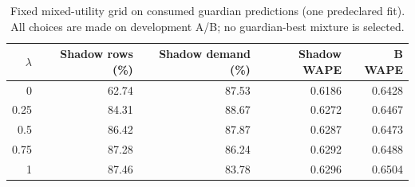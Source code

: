 \begin{table}[htbp]\centering\small
\caption{Fixed mixed-utility grid on consumed guardian predictions (one predeclared fit). All choices are made on development A/B; no guardian-best mixture is selected.}
\label{tab:mixed}
\begin{tabular}{rrrrr}\toprule
$\lambda$ & Shadow rows (\%) & Shadow demand (\%) & Shadow WAPE & B WAPE\\\midrule
0 & 62.74 & 87.53 & 0.6186 & 0.6428\\
0.25 & 84.31 & 88.67 & 0.6272 & 0.6467\\
0.5 & 86.42 & 87.87 & 0.6287 & 0.6473\\
0.75 & 87.28 & 86.24 & 0.6292 & 0.6488\\
1 & 87.46 & 83.78 & 0.6296 & 0.6504\\
\bottomrule\end{tabular}\end{table}
